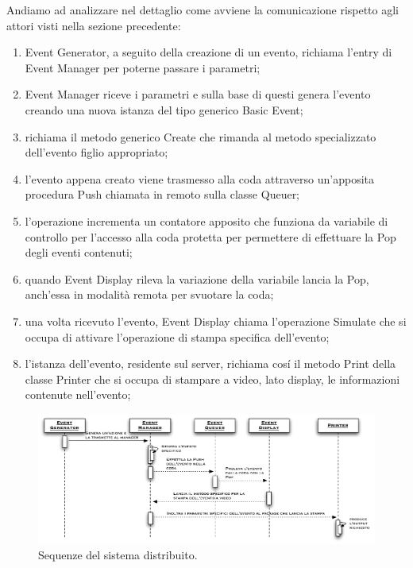 \documentclass[aps,letterpaper,10pt]{article}
\begin{document}
Andiamo ad analizzare nel dettaglio come avviene la comunicazione rispetto agli attori visti nella sezione precedente:

\begin{enumerate}
	\item Event Generator, a seguito della creazione di un evento, richiama l'entry di Event Manager per poterne passare i parametri;
	\item Event Manager riceve i parametri e sulla base di questi genera l'evento creando una nuova istanza del tipo generico Basic Event;
	\item richiama il metodo generico Create che rimanda al metodo specializzato dell'evento figlio appropriato;
	\item l'evento appena creato viene trasmesso alla coda attraverso un'apposita procedura Push chiamata in remoto sulla classe Queuer;
	\item l'operazione incrementa un contatore apposito che funziona da variabile di controllo per l'accesso alla coda protetta per permettere di effettuare la Pop degli eventi contenuti;
	\item quando Event Display rileva la variazione della variabile lancia la Pop, anch'essa in modalit\`a remota per svuotare la coda;
	\item una volta ricevuto l'evento, Event Display chiama l'operazione Simulate che si occupa di attivare l'operazione di stampa specifica dell'evento;
	\item l'istanza dell'evento, residente sul server, richiama cos\'i il metodo Print della classe Printer che si occupa di stampare a video, lato display, le informazioni contenute nell'evento;
\end{enumerate}

\begin{figure}[H]
	\begin{center}
		\includegraphics[width=480px]{images/dist-sequence.pdf}
	\end{center}
\caption{Sequenze del sistema distribuito.}
\end{figure}
\end{document}
